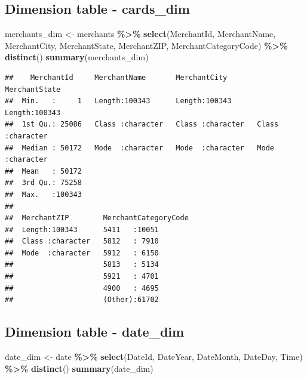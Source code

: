 \documentclass[
]{article}
\newenvironment{Shaded}{\begin{snugshade}}{\end{snugshade}}
\newcommand{\FunctionTok}[1]{\textcolor[rgb]{0.13,0.29,0.53}{\textbf{#1}}}
\newcommand{\NormalTok}[1]{#1}
\newcommand{\OtherTok}[1]{\textcolor[rgb]{0.56,0.35,0.01}{#1}}
\newcommand{\SpecialCharTok}[1]{\textcolor[rgb]{0.81,0.36,0.00}{\textbf{#1}}}
\begin{document}
\subsection{Dimension table -
cards\_dim}\label{dimension-table---cards_dim-1}

\begin{Shaded}
\begin{Highlighting}[]
\NormalTok{merchants\_dim }\OtherTok{\textless{}{-}}\NormalTok{ merchants }\SpecialCharTok{\%\textgreater{}\%} \FunctionTok{select}\NormalTok{(MerchantId, MerchantName, MerchantCity, }
\NormalTok{                                      MerchantState, MerchantZIP, }
\NormalTok{                                      MerchantCategoryCode) }\SpecialCharTok{\%\textgreater{}\%} \FunctionTok{distinct}\NormalTok{()}
\FunctionTok{summary}\NormalTok{(merchants\_dim)}
\end{Highlighting}
\end{Shaded}

\begin{verbatim}
##    MerchantId     MerchantName       MerchantCity       MerchantState     
##  Min.   :     1   Length:100343      Length:100343      Length:100343     
##  1st Qu.: 25086   Class :character   Class :character   Class :character  
##  Median : 50172   Mode  :character   Mode  :character   Mode  :character  
##  Mean   : 50172                                                           
##  3rd Qu.: 75258                                                           
##  Max.   :100343                                                           
##                                                                           
##  MerchantZIP        MerchantCategoryCode
##  Length:100343      5411   :10051       
##  Class :character   5812   : 7910       
##  Mode  :character   5912   : 6150       
##                     5813   : 5134       
##                     5921   : 4701       
##                     4900   : 4695       
##                     (Other):61702
\end{verbatim}

\subsection{Dimension table -
date\_dim}\label{dimension-table---date_dim}

\begin{Shaded}
\begin{Highlighting}[]
\NormalTok{date\_dim }\OtherTok{\textless{}{-}}\NormalTok{ date }\SpecialCharTok{\%\textgreater{}\%} \FunctionTok{select}\NormalTok{(DateId, DateYear, DateMonth, }
\NormalTok{                            DateDay, Time) }\SpecialCharTok{\%\textgreater{}\%} \FunctionTok{distinct}\NormalTok{()}
\FunctionTok{summary}\NormalTok{(date\_dim)}
\end{Highlighting}
\end{Shaded}
\end{document}
